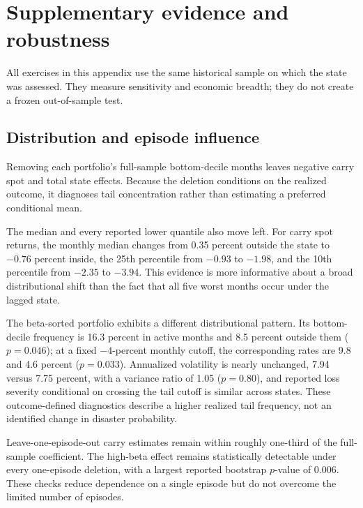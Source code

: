 \section{Supplementary evidence and robustness}
\label{app:inherited-robustness}

All exercises in this appendix use the same historical sample on which the state was assessed. They measure sensitivity and economic breadth; they do not create a frozen out-of-sample test.

\subsection{Distribution and episode influence}

Removing each portfolio's full-sample bottom-decile months leaves negative carry spot and total state effects. Because the deletion conditions on the realized outcome, it diagnoses tail concentration rather than estimating a preferred conditional mean.



The median and every reported lower quantile also move left. For carry spot returns, the monthly median changes from 0.35 percent outside the state to $-0.76$ percent inside, the 25th percentile from $-0.93$ to $-1.98$, and the 10th percentile from $-2.35$ to $-3.94$. This evidence is more informative about a broad distributional shift than the fact that all five worst months occur under the lagged state.

The beta-sorted portfolio exhibits a different distributional pattern. Its bottom-decile frequency is 16.3 percent in active months and 8.5 percent outside them ($p=0.046$); at a fixed $-4$-percent monthly cutoff, the corresponding rates are 9.8 and 4.6 percent ($p=0.033$). Annualized volatility is nearly unchanged, 7.94 versus 7.75 percent, with a variance ratio of 1.05 ($p=0.80$), and reported loss severity conditional on crossing the tail cutoff is similar across states. These outcome-defined diagnostics describe a higher realized tail frequency, not an identified change in disaster probability.

Leave-one-episode-out carry estimates remain within roughly one-third of the full-sample coefficient. The high-beta effect remains statistically detectable under every one-episode deletion, with a largest reported bootstrap $p$-value of 0.006. These checks reduce dependence on a single episode but do not overcome the limited number of episodes.

